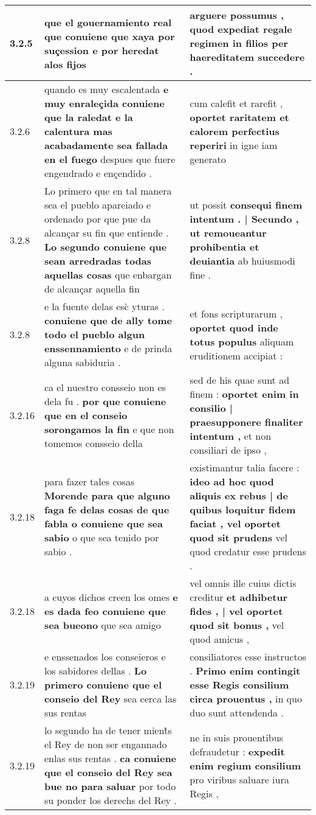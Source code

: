 \begin{tabular}{|p{1cm}|p{6.5cm}|p{6.5cm}|}
3.2.5 & que el gouernamiento real \textbf{ que conuiene que xaya por suçession } e por heredat alos fijos & arguere possumus , \textbf{ quod expediat regale regimen } in filios per haereditatem succedere . \\\hline
3.2.6 & quando es muy escalentada \textbf{ e muy enraleçida conuiene que la raledat e la calentura mas acabadamente sea fallada en el fuego } despues que fuere engendrado e ençendido . & cum calefit et rarefit , \textbf{ oportet raritatem et calorem perfectius reperiri } in igne iam generato \\\hline
3.2.8 & Lo primero que en tal manera sea el pueblo apareiado e ordenado por que pue da alcançar su fin que entiende . \textbf{ Lo segundo conuiene que sean arredradas todas aquellas cosas } que enbargan de alcançar aquella fin & ut possit \textbf{ consequi finem intentum . | Secundo , ut remoueantur prohibentia et deuiantia } ab huiusmodi fine . \\\hline
3.2.8 & e la fuente delas esc̀ yturas . \textbf{ conuiene que de ally tome todo el pueblo algun enssennamiento } e de prinda alguna sabiduria . & et fons scripturarum , \textbf{ oportet quod inde totus populus } aliquam eruditionem accipiat : \\\hline
3.2.16 & ca el nuestro consseio non es dela fu . \textbf{ por que conuiene que en el conseio sorongamos la fin } e que non tomemos consseio della & sed de his quae sunt ad finem : \textbf{ oportet enim in consilio | praesupponere finaliter intentum , } et non consiliari de ipso , \\\hline
3.2.18 & para fazer tales cosas \textbf{ Morende para que alguno faga fe delas cosas de que fabla o conuiene que sea sabio } o que sea tenido por sabio . & existimantur talia facere : \textbf{ ideo ad hoc quod aliquis ex rebus | de quibus loquitur fidem faciat , vel oportet quod sit prudens } vel quod credatur esse prudens . \\\hline
3.2.18 & a cuyos dichos creen los omes \textbf{ e es dada feo conuiene que sea bueono } que sea amigo & vel omnis ille cuius dictis creditur \textbf{ et adhibetur fides , | vel oportet quod sit bonus , } vel quod amicus , \\\hline
3.2.19 & e enssenados los conseieros e los sabidores dellas . \textbf{ Lo primero conuiene que el conseio del Rey } sea cerca las sus rentas & consiliatores esse instructos . \textbf{ Primo enim contingit esse Regis consilium circa prouentus , } in quo duo sunt attendenda . \\\hline
3.2.19 & lo segundo ha de tener mient̃s el Rey de non ser engannado enlas sus rentas . \textbf{ ca conuiene que el conseio del Rey sea bue no para saluar } por todo su ponder los derechs del Rey . & ne in suis prouentibus defraudetur : \textbf{ expedit enim regium consilium } pro viribus saluare iura Regis , \\\hline

\end{tabular}
